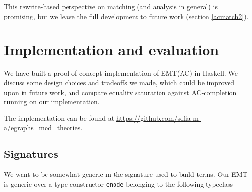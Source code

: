 \documentclass[12pt,a4paper,twoside,openright]{report}
\numberwithin{equation}{chapter}		%
\numberwithin{figure}{chapter}			%
\numberwithin{table}{chapter}			%
\theoremstyle{definition}
\theoremstyle{plain}
\begin{document}
This rewrite-based perspective on matching (and analysis in general) is promising, but we leave the full development to future work (section \ref{acmatch2}).






\chapter{Implementation and evaluation} \label{impl}
We have built a proof-of-concept implementation of EMT(AC) in Haskell. We discuss some design choices and tradeoffs we made, which could be improved upon in future work, and compare equality saturation against AC-completion running on our implementation.

The implementation can be found at \url{https://github.com/sofia-m-a/egraphs_mod_theories}.

\section{Signatures}
We want to be somewhat generic in the signature used to build terms. Our EMT is generic over a type constructor \texttt{enode} belonging to the following typeclass
\end{document}
